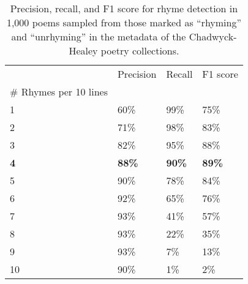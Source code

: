 \begin{table}[H]
  \centering
  \small
  \singlespacing
  \begin{tabular}{llll}
  \toprule
   & Precision & Recall & F1 score \\
  \# Rhymes per 10 lines &  &  &  \\
  \midrule
  1 & 60\% & 99\% & 75\% \\
  2 & 71\% & 98\% & 83\% \\
  3 & 82\% & 95\% & 88\% \\
  \textbf{4} & \textbf{88\%} & \textbf{90\%} & \textbf{89\%} \\
  5 & 90\% & 78\% & 84\% \\
  6 & 92\% & 65\% & 76\% \\
  7 & 93\% & 41\% & 57\% \\
  8 & 93\% & 22\% & 35\% \\
  9 & 93\% & 7\% & 13\% \\
  10 & 90\% & 1\% & 2\% \\
  \bottomrule
  \end{tabular}
  \caption{Precision, recall, and F1 score for rhyme detection in 1,000 poems sampled from those marked as ``rhyming'' and ``unrhyming'' in the metadata of the Chadwyck-Healey poetry collections.}
  \label{tab:rhyme_validation}
\end{table}